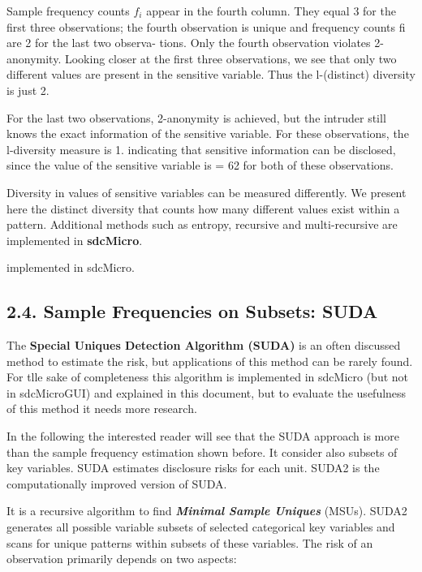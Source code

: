 \documentclass[]{article}
\begin{document}
Sample frequency counts $f_i$ appear in the fourth column. They equal 3 for the ﬁrst three observations; the
fourth observation is unique and frequency counts fi are 2 for the last two observa-
tions. Only the fourth observation violates 2-anonymity. Looking closer at the ﬁrst
three observations, we see that only two different values are present in the sensitive
variable. Thus the l-(distinct) diversity is just 2. 

For the last two observations,
2-anonymity is achieved, but the intruder still knows the exact information of the
sensitive variable. For these observations, the l-diversity measure is 1. indicating
that sensitive information can be disclosed, since the value of the sensitive variable
is = 62 for both of these observations.

Diversity in values of sensitive variables can be measured differently. We present
here the distinct diversity that counts how many different values exist within a
pattern. Additional methods such as entropy, recursive and multi-recursive are implemented in \textbf{sdcMicro}.

 implemented in sdcMicro.


\subsection*{2.4. Sample Frequencies on Subsets: SUDA}
The \textbf{Special Uniques Detection Algorithm (SUDA)} is an often discussed method
to estimate the risk, but applications of this method can be rarely found. For
tlle sake of completeness this algorithm is implemented in sdcMicro (but not in
sdcMicroGUI) and explained in this document, but to evaluate the usefulness of
this method it needs more research. 

In the following the interested reader will
see that the SUDA approach is more than the sample frequency estimation shown
before. It consider also subsets of key variables. SUDA estimates disclosure risks
for each unit. SUDA2  is the computationally improved
version of SUDA. 

It is a recursive algorithm to ﬁnd \textbf{\textit{Minimal Sample Uniques}}
(MSUs). SUDA2 generates all possible variable subsets of selected categorical key
variables and scans for unique patterns within subsets of these variables. The risk
of an observation primarily depends on two aspects:
\end{document}
